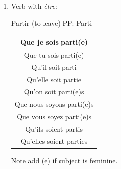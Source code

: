 \documentclass{book}
\begin{document}
\begin{itemize}
\begin{enumerate}
                    \item Verb with \textit{être}:
                        \begin{center}
                            Partir (to leave) PP: Parti \\
                            \begin{tabular}{|c|}
                                \hline
                                Que je sois parti(e) \\
                                \hline
                                Que tu sois parti(e) \\
                                \hline
                                Qu'il soit parti \\
                                \hline
                                Qu'elle soit partie \\
                                \hline
                                Qu'on soit parti(e)s \\
                                \hline
                                Que nous soyons parti(e)s \\
                                \hline
                                Que vous soyez parti(e)s \\
                                \hline
                                Qu'ils soient partis \\
                                \hline
                                Qu'elles soient parties \\
                                \hline
                            \end{tabular}
                        \end{center}
                        Note add (e) if subject is feminine.
                \end{enumerate}


\end{itemize}
\end{document}
